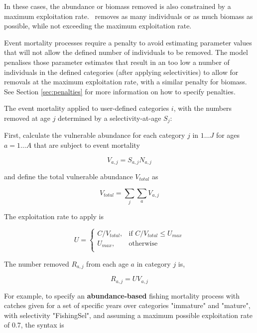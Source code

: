 In these cases, the abundance or biomass removed is also constrained by a maximum exploitation rate. \CNAME~removes as many individuals or as much biomass as possible,  while not exceeding the maximum exploitation rate.

Event mortality processes require a penalty to avoid estimating parameter values that will not allow the defined number of individuals to be removed. The model penalises those parameter estimates that result in an too low a number of individuals in the defined categories (after applying selectivities) to allow for removals at the maximum exploitation rate, with a similar penalty for biomass. See Section \ref{sec:penalties} for more information on how to specify penalties.

The event mortality applied to user-defined categories $i$, with the numbers removed at age $j$ determined by a selectivity-at-age $S_j$:

First, calculate the vulnerable abundance for each category $j$ in $1 \ldots J$ for ages $a = 1 \ldots A$ that are subject to event mortality

\begin{equation}
  V_{a,j} = S_{a,j} N_{a,j}
\end{equation}

and define the total vulnerable abundance $V_{total}$ as

\begin{equation}
  V_{total}  = \sum\limits_j {\sum\limits_a {V_{a,j}}}
\end{equation}

The exploitation rate to apply is

\begin{equation}
U = \begin{cases}
  C/V_{total}, & \text{if $C/V_{total} \leq U_{max}$} \\
  U_{max}, & \text{otherwise}\\
  \end{cases}
\end{equation}

The number removed $R_{a,j}$ from each age $a$ in category $j$ is,

\begin{equation}
  R_{a,j} = U V_{a,j}
\end{equation}

For example, to specify an \textbf{abundance-based} fishing mortality process with catches given for a set of specific years over categories "immature" and "mature", with selectivity "FishingSel", and assuming a maximum possible exploitation rate of 0.7, the syntax is

